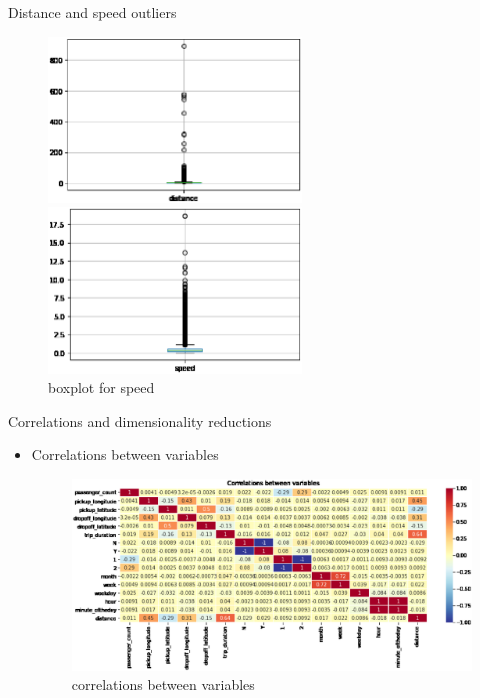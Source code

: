 \documentclass[
 size=14pt,
 paper=smartboard,  %
 mode=present, 		%
 display=slides, 	%
 style=tuliplab,  	%
 pauseslide,
 fleqn,leqno]{powerdot}
\begin{document}
\begin{slide}{Distance and speed outliers}
\begin{figure}
\begin{minipage}{0.5\linewidth}
\centering
\includegraphics[width=0.6\textwidth]{distance.eps}
\caption{boxplot for distance}
\end{minipage}
\begin{minipage}{0.5\linewidth}
\centering
\includegraphics[width=0.6\textwidth]{speed.eps}
\caption{boxplot for speed}
\end{minipage}
\end{figure}
\end{slide}

\begin{slide}[toc=,bm=]{Correlations and dimensionality reductions}
\begin{itemize}
\item
Correlations between variables
\vspace{1cm}
\begin{figure}
\centering
{}
\includegraphics[scale=0.4]{correlations between variables.eps}
\caption{correlations between variables}
\end{figure}
\end{itemize}
\end{slide}
\end{document}
